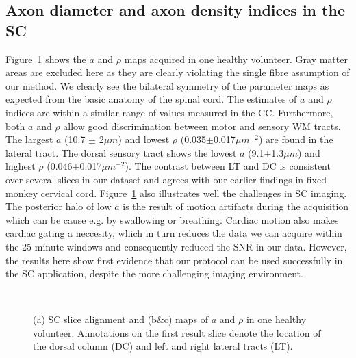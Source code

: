 \subsection{Axon diameter and axon density indices in the SC}
Figure~\ref{fig:chap 9 SC results} shows the $a$ and $\rho$ maps acquired in one healthy volunteer. Gray matter areas are excluded here as they are clearly violating the single fibre assumption of our method.  We clearly see the bilateral symmetry of the parameter maps as expected from the basic anatomy of the spinal cord. The estimates of $a$ and $\rho$ indices are within a similar range of values measured in the CC. Furthermore, both $a$ and $\rho$ allow good discrimination between motor and sensory WM tracts. The largest $a$ (10.7 $\pm$ 2$\mu m$) and lowest $\rho$ (0.035$\pm$0.017$\mu m^{-2}$) are found in the lateral tract. The dorsal sensory tract shows the lowest $a$ (9.1$\pm$1.3$\mu m$) and highest $\rho$ (0.046$\pm$0.017$\mu m^{-2}$). The contrast between LT and DC is consistent over several slices in our dataset and agrees with our earlier findings in fixed monkey cervical cord. Figure~\ref{fig:chap 9 SC results} also illustrates well the challenges in SC imaging. The posterior halo of low $a$ is the result of motion artifacts during the acquisition which can be cause e.g. by swallowing or breathing. Cardiac motion also makes cardiac gating a neccesity, which in turn reduces the data we can acquire within the 25 minute windows and consequently reduced the SNR in our data. However, the results here show first evidence that our \SFasym{} protocol can be used successfully in the SC application, despite the more challenging imaging environment.
\begin{figure}[ht]
	\centering
	\begin{minipage}{0.39\textwidth}
	\end{minipage}
	\begin{minipage}{0.59\textwidth}
			\\
	\end{minipage}
	\caption{(a) SC slice alignment  and  (b\&c) maps of $a$ and $\rho$ in one healthy volunteer. Annotations on the first result slice denote the location of the dorsal column (DC) and left and right lateral tracts (LT).}
	\label{fig:chap 9 SC results}
\end{figure}

